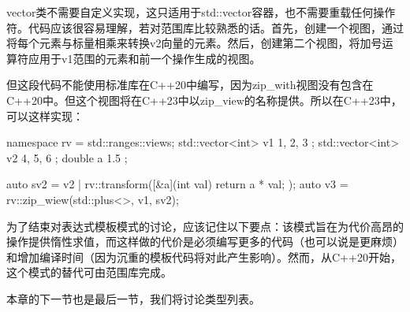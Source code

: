 vector类不需要自定义实现，这只适用于std::vector容器，也不需要重载任何操作符。代码应该很容易理解，若对范围库比较熟悉的话。首先，创建一个视图，通过将每个元素与标量相乘来转换v2向量的元素。然后，创建第二个视图，将加号运算符应用于v1范围的元素和前一个操作生成的视图。

但这段代码不能使用标准库在C++20中编写，因为zip_with视图没有包含在C++20中。但这个视图将在C++23中以zip_view的名称提供。所以在C++23中，可以这样实现：

\begin{cppcode}
namespace rv = std::ranges::views;
std::vector<int> v1{ 1, 2, 3 };
std::vector<int> v2{ 4, 5, 6 };
double a { 1.5 };

auto sv2 = v2 |
           rv::transform([&a](int val) {return a * val; });
auto v3 = rv::zip_wiew(std::plus<>{}, v1, sv2);
\end{cppcode}

为了结束对表达式模板模式的讨论，应该记住以下要点：该模式旨在为代价高昂的操作提供惰性求值，而这样做的代价是必须编写更多的代码（也可以说是更麻烦）和增加编译时间（因为沉重的模板代码将对此产生影响）。然而，从C++20开始，这个模式的替代可由范围库完成。

本章的下一节也是最后一节，我们将讨论类型列表。













